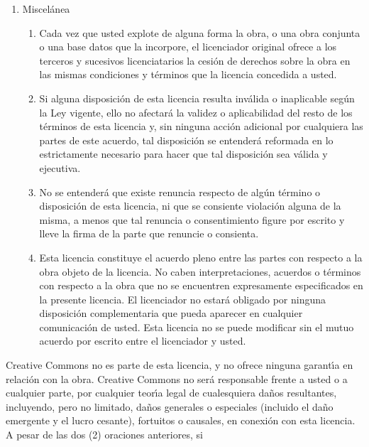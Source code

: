 \begin{enumerate}
\begin{enumerate}
  \end{enumerate}

\item Miscel\'anea

  \begin{enumerate}

  \item Cada vez que usted explote de alguna forma la obra, o una obra
    conjunta o una base datos que la incorpore, el licenciador
    original ofrece a los terceros y sucesivos licenciatarios la
    cesi\'on de derechos sobre la obra en las mismas condiciones y
    t\'erminos que la licencia concedida a usted.

  \item Si alguna disposici\'on de esta licencia resulta inv\'alida o
    inaplicable seg\'un la Ley vigente, ello no afectar\'a la validez
    o aplicabilidad del resto de los t\'erminos de esta licencia y,
    sin ninguna acci\'on adicional por cualquiera las partes de este
    acuerdo, tal disposici\'on se entender\'a reformada en lo
    estrictamente necesario para hacer que tal disposici\'on sea
    v\'alida y ejecutiva.

  \item No se entender\'a que existe renuncia respecto de alg\'un
    t\'ermino o disposici\'on de esta licencia, ni que se consiente
    violaci\'on alguna de la misma, a menos que tal renuncia o
    consentimiento figure por escrito y lleve la firma de la parte que
    renuncie o consienta.

  \item Esta licencia constituye el acuerdo pleno entre las partes con
    respecto a la obra objeto de la licencia.  No caben
    interpretaciones, acuerdos o t\'erminos con respecto a la obra que
    no se encuentren expresamente especificados en la presente
    licencia. El licenciador no estar\'a obligado por ninguna
    disposici\'on complementaria que pueda aparecer en cualquier
    comunicaci\'on de usted. Esta licencia no se puede modificar sin
    el mutuo acuerdo por escrito entre el licenciador y usted.

  \end{enumerate}

\end{enumerate}

Creative Commons no es parte de esta licencia, y no ofrece ninguna
garant\'\i{}a en relaci\'on con la obra. Creative Commons no ser\'a
responsable frente a usted o a cualquier parte, por cualquier
teor\'\i{}a legal de cualesquiera da\~nos resultantes, incluyendo,
pero no limitado, da\~nos generales o especiales (incluido el da\~no
emergente y el lucro cesante), fortuitos o causales, en conexi\'on con
esta licencia. A pesar de las dos (2) oraciones anteriores, si

